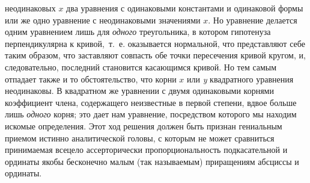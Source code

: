 неодинаковых $x$ два уравнения с одинаковыми
константами и одинаковой формы или же одно уравнение с неодинаковыми
значениями $x$. Но уравнение делается одним уравнением лишь для
{\em одного} треугольника, в котором гипотенуза
перпендикулярна к кривой,~т.~е. оказывается нормальной, что представляют
себе таким образом, что заставляют совпасть обе точки пересечения кривой
кругом, и, следовательно, последний становится касающимся кривой. Но тем
самым отпадает также и то обстоятельство, что корни
$x$ или {\em y} квадратного уравнения неодинаковы. В квадратном
же уравнении с двумя одинаковыми корнями коэффициент члена, содержащего
неизвестные в первой степени, вдвое больше лишь
{\em одного} корня; это дает нам уравнение, посредством
которого мы находим искомые определения. Этот ход решения должен быть
признан гениальным приемом истинно аналитической головы, с которым не может
сравниться принимаемая всецело ассерторически пропорциональность
подкасательной и ординаты якобы бесконечно малым (так называемым)
приращениям абсциссы и ординаты.

